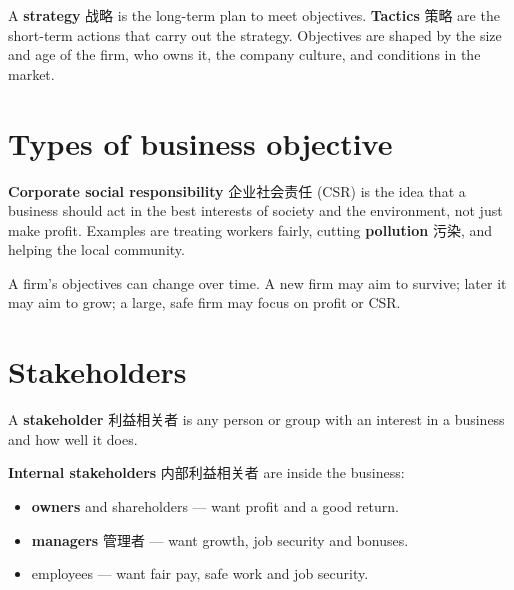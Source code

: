\documentclass[11pt]{article}
\begin{document}
A \textbf{strategy} 战略 is the long-term plan to meet objectives. \textbf{Tactics} 策略 are the short-term actions that carry out the strategy. Objectives are shaped by the size and age of the firm, who owns it, the company culture, and conditions in the market.

\section*{Types of business objective}

\begin{center}
\end{center}

\textbf{Corporate social responsibility} 企业社会责任 (CSR) is the idea that a business should act in the best interests of society and the environment, not just make profit. Examples are treating workers fairly, cutting \textbf{pollution} 污染, and helping the local community.

A firm's objectives can change over time. A new firm may aim to survive; later it may aim to grow; a large, safe firm may focus on profit or CSR.

\section*{Stakeholders}

A \textbf{stakeholder} 利益相关者 is any person or group with an interest in a business and how well it does.

\textbf{Internal stakeholders} 内部利益相关者 are inside the business:

\begin{itemize}
\item \textbf{owners} and shareholders — want profit and a good return.

\item \textbf{managers} 管理者 — want growth, job security and bonuses.

\item employees — want fair pay, safe work and job security.

\end{itemize}
\end{document}
